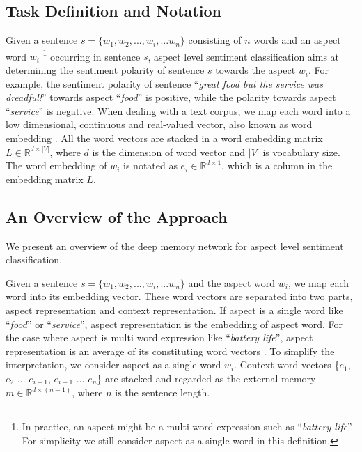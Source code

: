 \documentclass[11pt,letterpaper]{article}
\begin{document}
\subsection{Task Definition and Notation}
Given a sentence $s=\{w_1, w_2, ..., w_i, ... w_n\}$ consisting of $n$ words and an aspect word $w_i$ \footnote{In practice, an aspect might be a multi word expression such as ``\textit{battery life}''. For simplicity we still consider aspect as a single word in this definition.} occurring in sentence $s$, aspect level sentiment classification aims at determining the sentiment polarity of sentence $s$ towards the aspect $w_i$. 
For example, the sentiment polarity of sentence ``\textit{great food but the service was dreadful!}''  towards aspect ``\textit{food}'' is positive, while the polarity towards aspect ``\textit{service}'' is negative. 
When dealing with a text corpus, we map each word into a low dimensional, continuous and real-valued vector, also known as word embedding \cite{Mikolov2013a,Pennington2014}.
All the word vectors are stacked in a word embedding matrix $L \in \mathbb{R}^{d \times |V|}$, where $d$ is the dimension of word vector and $|V|$ is vocabulary size.
The word embedding of $w_i$ is notated as $e_i \in \mathbb{R}^{d \times 1}$, which is a column in the embedding matrix $L$. 





\subsection{An Overview of the Approach}
We present an overview of the deep memory network for aspect level sentiment classification. 


Given a sentence $s=\{w_1, w_2, ..., w_i, ... w_n\}$ and the aspect word $w_i$, we map each word into its embedding vector. 
These word vectors are separated into two parts, aspect representation and context representation. 
If aspect is a single word like ``\textit{food}'' or ``\textit{service}'', aspect representation is the embedding of aspect word.
For the case where aspect is multi word expression like ``\textit{battery life}'', aspect representation is an average of its constituting word vectors \cite{Sun2015}. 
To simplify the interpretation, we consider aspect as a single word $w_i$. 
Context word vectors \{$e_1$, $e_2$ ... $e_{i-1}$, $e_{i+1}$  ... $e_n$\} are stacked and regarded as the external memory $m \in \mathbb{R}^{d \times (n-1)}$, where $n$ is the sentence length. 
\end{document}

